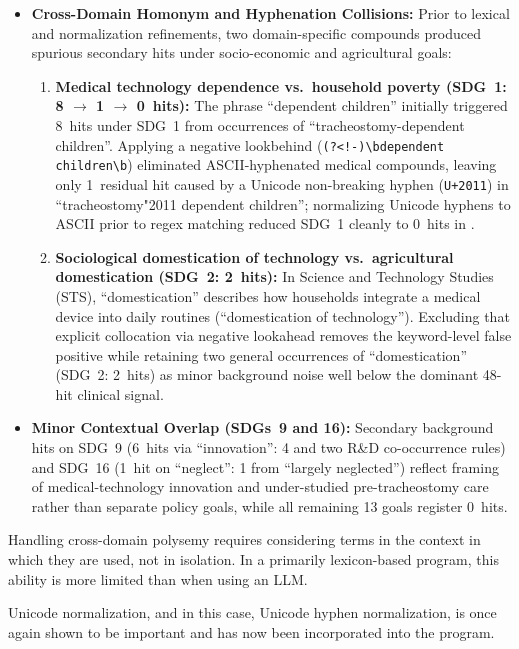 \begin{casestudySection}
\begin{itemize}
  \item \textbf{Cross-Domain Homonym and Hyphenation Collisions:} Prior to lexical and normalization refinements, two domain-specific compounds produced spurious secondary hits under socio-economic and agricultural goals:
  \begin{enumerate}
    \item \textbf{Medical technology dependence vs.\ household poverty (\gls{SDG}~1: \num{8} $\rightarrow$ \num{1} $\rightarrow$ \num{0}~hits):} The phrase \enquote{dependent children} initially triggered \num{8}~hits under \gls{SDG}~1 from occurrences of \enquote{tracheostomy-dependent children}. Applying a negative lookbehind (\texttt{(?<!-)\textbackslash bdependent children\textbackslash b}) eliminated ASCII-hyphenated medical compounds, leaving only \num{1}~residual hit caused by a Unicode non-breaking hyphen (\texttt{U+2011}) in \enquote{tracheostomy\char"2011 dependent children}; normalizing Unicode hyphens to ASCII prior to regex matching reduced \gls{SDG}~1 cleanly to \num{0}~hits in .
    
    \item \textbf{Sociological domestication of technology vs.\ agricultural domestication (\gls{SDG}~2: \num{2}~hits):} In Science and Technology Studies (STS), \enquote{domestication} describes how households integrate a medical device into daily routines (\enquote{domestication of technology}). Excluding that explicit collocation via negative lookahead removes the keyword-level false positive while retaining two general occurrences of \enquote{domestication} (\gls{SDG}~2: \num{2}~hits) as minor background noise well below the dominant \num{48}-hit clinical signal.
  \end{enumerate}

  \item \textbf{Minor Contextual Overlap (\glspl{SDG}~9 and 16):} Secondary background hits on \gls{SDG}~9 (\num{6}~hits via \enquote{innovation}: 4 and two R\&D co-occurrence rules) and \gls{SDG}~16 (\num{1}~hit on \enquote{neglect}: 1 from \enquote{largely neglected}) reflect framing of medical-technology innovation and under-studied pre-tracheostomy care rather than separate policy goals, while all remaining \num{13} goals register \num{0}~hits.
\end{itemize}
\end{casestudySection}

\begin{takeaway}
Handling cross-domain polysemy requires considering terms in the context in which they are used, not in isolation. In a primarily lexicon-based program, this ability is more limited than when using an \gls{LLM}.
\medskip

Unicode normalization, and in this case, Unicode hyphen normalization, is once again shown to be important and has now been incorporated into the program.
\end{takeaway}

